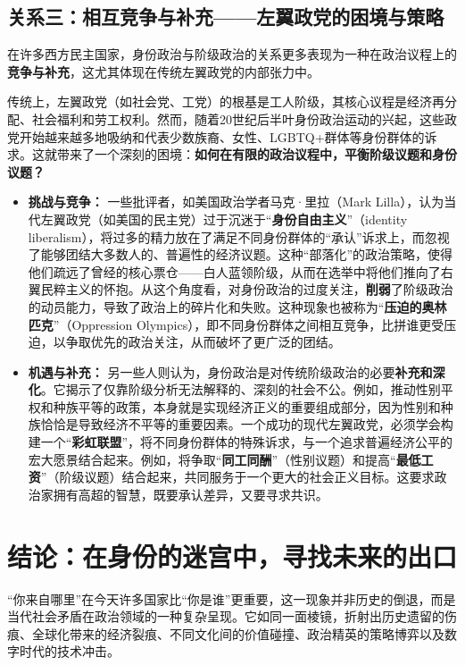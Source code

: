 \subsection{关系三：相互竞争与补充——左翼政党的困境与策略}

在许多西方民主国家，身份政治与阶级政治的关系更多表现为一种在政治议程上的\textbf{竞争与补充}，这尤其体现在传统左翼政党的内部张力中。

传统上，左翼政党（如社会党、工党）的根基是工人阶级，其核心议程是经济再分配、社会福利和劳工权利。然而，随着20世纪后半叶身份政治运动的兴起，这些政党开始越来越多地吸纳和代表少数族裔、女性、LGBTQ+群体等身份群体的诉求。这就带来了一个深刻的困境：\textbf{如何在有限的政治议程中，平衡阶级议题和身份议题？}
\begin{itemize}
    \item \textbf{挑战与竞争：} 一些批评者，如美国政治学者马克·里拉（Mark Lilla），认为当代左翼政党（如美国的民主党）过于沉迷于“\textbf{身份自由主义}”（identity liberalism），将过多的精力放在了满足不同身份群体的“承认”诉求上，而忽视了能够团结大多数人的、普遍性的经济议题。这种“部落化”的政治策略，使得他们疏远了曾经的核心票仓——白人蓝领阶级，从而在选举中将他们推向了右翼民粹主义的怀抱。从这个角度看，对身份政治的过度关注，\textbf{削弱}了阶级政治的动员能力，导致了政治上的碎片化和失败。这种现象也被称为“\textbf{压迫的奥林匹克}”（Oppression Olympics），即不同身份群体之间相互竞争，比拼谁更受压迫，以争取优先的政治关注，从而破坏了更广泛的团结。

    \item \textbf{机遇与补充：} 另一些人则认为，身份政治是对传统阶级政治的必要\textbf{补充和深化}。它揭示了仅靠阶级分析无法解释的、深刻的社会不公。例如，推动性别平权和种族平等的政策，本身就是实现经济正义的重要组成部分，因为性别和种族恰恰是导致经济不平等的重要因素。一个成功的现代左翼政党，必须学会构建一个“\textbf{彩虹联盟}”，将不同身份群体的特殊诉求，与一个追求普遍经济公平的宏大愿景结合起来。例如，将争取“\textbf{同工同酬}”（性别议题）和提高“\textbf{最低工资}”（阶级议题）结合起来，共同服务于一个更大的社会正义目标。这要求政治家拥有高超的智慧，既要承认差异，又要寻求共识。
\end{itemize}

\section{ 结论：在身份的迷宫中，寻找未来的出口}

“你来自哪里”在今天许多国家比“你是谁”更重要，这一现象并非历史的倒退，而是当代社会矛盾在政治领域的一种复杂呈现。它如同一面棱镜，折射出历史遗留的伤痕、全球化带来的经济裂痕、不同文化间的价值碰撞、政治精英的策略博弈以及数字时代的技术冲击。

